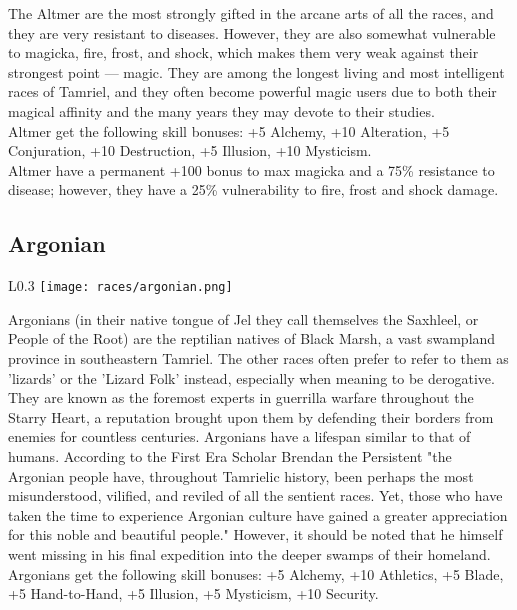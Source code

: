 The Altmer are the most strongly gifted in the arcane arts of all the races, and they are very resistant to diseases. However, they are also somewhat vulnerable to magicka, fire, frost, and shock, which makes them very weak against their strongest point --- magic. They are among the longest living and most intelligent races of Tamriel, and they often become powerful magic users due to both their magical affinity and the many years they may devote to their studies.\\

Altmer get the following skill bonuses: +5 Alchemy, +10 Alteration, +5 Conjuration, +10 Destruction, +5 Illusion, +10 Mysticism.\\

Altmer have a permanent +100 bonus to max magicka and a 75\% resistance to disease; however, they have a 25\% vulnerability to fire, frost and shock damage.

\subsection{Argonian}
\begin{wrapfigure}{L}{0.3\textwidth}
	\texttt{[image: races/argonian.png]}
\end{wrapfigure}

Argonians (in their native tongue of Jel they call themselves the Saxhleel, or People of the Root) are the reptilian natives of Black Marsh, a vast swampland province in southeastern Tamriel. The other races often prefer to refer to them as 'lizards' or the 'Lizard Folk' instead, especially when meaning to be derogative. They are known as the foremost experts in guerrilla warfare throughout the Starry Heart, a reputation brought upon them by defending their borders from enemies for countless centuries. Argonians have a lifespan similar to that of humans. According to the First Era Scholar Brendan the Persistent "the Argonian people have, throughout Tamrielic history, been perhaps the most misunderstood, vilified, and reviled of all the sentient races. Yet, those who have taken the time to experience Argonian culture have gained a greater appreciation for this noble and beautiful people." However, it should be noted that he himself went missing in his final expedition into the deeper swamps of their homeland.\\

Argonians get the following skill bonuses: +5 Alchemy, +10 Athletics, +5 Blade, +5 Hand-to-Hand, +5 Illusion, +5 Mysticism, +10 Security.\\

